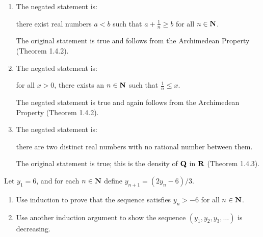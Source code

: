 \documentclass{lew98_solutions}
\begin{document}
\begin{solution}
    \begin{enumerate}
        \item The negated statement is:
        \begin{center}
            there exist real numbers \( a < b \) such that \( a + \tfrac{1}{n} \geq b \) for all \( n \in \mathbf{N} \).
        \end{center}
        The original statement is true and follows from the Archimedean Property (Theorem 1.4.2).

        \item The negated statement is:
        \begin{center}
            for all \( x > 0 \), there exists an \( n \in \mathbf{N} \) such that \( \tfrac{1}{n} \leq x \).
        \end{center}
        The negated statement is true and again follows from the Archimedean Property (Theorem 1.4.2).

        \item The negated statement is:
        \begin{center}
            there are two distinct real numbers with no rational number between them.
        \end{center}
        The original statement is true; this is the density of \( \mathbf{Q} \) in \( \mathbf{R} \) (Theorem 1.4.3).
    \end{enumerate}
\end{solution}

\begin{exercise}
\label{ex:1.2.12}
    Let \( y_1 = 6 \), and for each \( n \in \mathbf{N} \) define \( y_{n+1} = (2y_n - 6)/3 \).
    \begin{enumerate}
        \item Use induction to prove that the sequence satisfies \( y_n > -6 \) for all \( n \in \mathbf{N} \).

        \item Use another induction argument to show the sequence \( (y_1, y_2, y_3, \ldots) \) is decreasing.
    \end{enumerate}
\end{exercise}
\end{document}
